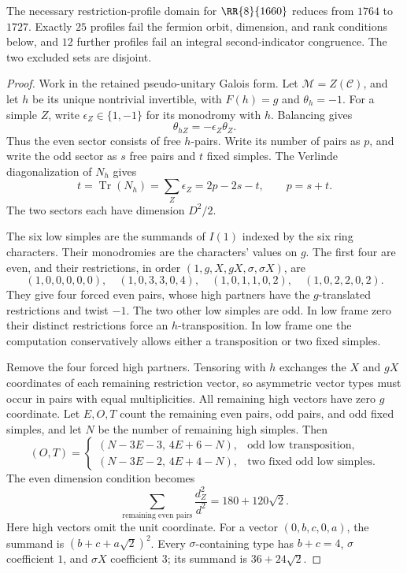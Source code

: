 \begin{proposition}\label{prop:1660-fermion-profiles}
The necessary restriction-profile domain for $\RR{8}{1660}$ reduces from
$1764$ to $1727$. Exactly $25$ profiles fail the fermion orbit, dimension,
and rank conditions below, and $12$ further profiles fail an integral
second-indicator congruence. The two excluded sets are disjoint.
\end{proposition}
\begin{proof}
Work in the retained pseudo-unitary Galois form.
Let $\mathcal M=Z(\mathcal C)$, and let $h$ be its unique nontrivial
invertible, with $F(h)=g$ and $\theta_h=-1$.
For a simple $Z$, write $\epsilon_Z\in\{1,-1\}$ for its monodromy with
$h$. Balancing gives
\[
 \theta_{hZ}=-\epsilon_Z\theta_Z.
\]
Thus the even sector consists of free $h$-pairs. Write its number of
pairs as $p$, and write the odd sector as $s$ free pairs and $t$ fixed
simples. The Verlinde diagonalization of $N_h$ gives
\[
 t=\operatorname{Tr}(N_h)=\sum_Z\epsilon_Z=2p-2s-t,
 \qquad p=s+t.
\]
The two sectors each have dimension $D^2/2$.

The six low simples are the summands of $I(1)$ indexed by the six ring
characters. Their monodromies are the characters' values on $g$.
The first four are even, and their restrictions, in order
$(1,g,X,gX,\sigma,\sigma X)$, are
\[
 (1,0,0,0,0,0),\quad(1,0,3,3,0,4),\quad
 (1,0,1,1,0,2),\quad(1,0,2,2,0,2).
\]
They give four forced even pairs, whose high partners have the
$g$-translated restrictions and twist $-1$. The two other low simples
are odd. In low frame zero their distinct restrictions force an
$h$-transposition. In low frame one the computation conservatively
allows either a transposition or two fixed simples.

Remove the four forced high partners. Tensoring with $h$ exchanges the
$X$ and $gX$ coordinates of each remaining restriction vector, so
asymmetric vector types must occur in pairs with equal multiplicities.
All remaining high vectors have zero $g$ coordinate.
Let $E,O,T$ count the remaining even pairs, odd pairs, and odd fixed
simples, and let $N$ be the number of remaining high simples. Then
\[
 (O,T)=
 \begin{cases}
 (N-3E-3,\,4E+6-N),&\text{odd low transposition},\\
 (N-3E-2,\,4E+4-N),&\text{two fixed odd low simples}.
 \end{cases}
\]
The even dimension condition becomes
\[
 \sum_{\text{remaining even pairs}}\frac{d_Z^2}{d^2}
       =180+120\sqrt2.
\]
Here high vectors omit the unit coordinate. For a vector $(0,b,c,0,a)$, the summand is
$(b+c+a\sqrt2)^2$. Every $\sigma$-containing type has
$b+c=4$, $\sigma$ coefficient $1$, and $\sigma X$ coefficient $3$;
its summand is $36+24\sqrt2$.


\end{proof}
